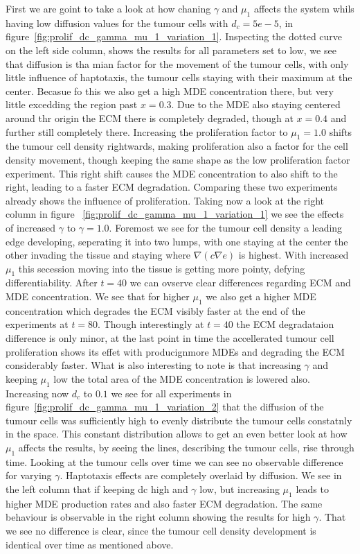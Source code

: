 First we are goint to take a look at how chaning $\gamma$ and $\mu_1$ affects the system whils having low diffusion values for the tumour cells with $d_c=5e-5$, in figure~\ref{fig:prolif_dc_gamma_mu_1_variation_1}. Inspecting the dotted curve on the left side column, shows the results for all parameters set to low, we see that diffusion is tha mian factor for the movement of the tumour cells, with only little influence of haptotaxis, the tumour cells staying with their maximum at the center. Becasue fo this we also get a high MDE concentration there, but very little excedding the region past $x=0.3$. Due to the MDE also staying centered around thr origin the ECM there is completely degraded, though at $x=0.4$ and further still completely there. Increasing the proliferation factor to $\mu_1=1.0$ shifts the tumour cell density rightwards, making proliferation also a factor for the cell density movement, though keeping the same shape as the low proliferation factor experiment. This right shift causes the MDE concentration to also shift to the right, leading to a faster ECM degradation. Comparing these two experiments already shows the influence of proliferation.\newline
Taking now a look at the right column in figure ~\ref{fig:prolif_dc_gamma_mu_1_variation_1} we see the effects of increased $\gamma$ to $\gamma=1.0$. Foremost we see for the tumour cell density a leading edge developing, seperating it into two lumps, with one staying at the center the other invading the tissue and staying where $\nabla (c \nabla e)$ is highest. With increased $\mu_1$ this secession moving into the tissue is getting more pointy, defying differentiability. After $t=40$ we can ovserve clear differences regarding ECM and MDE concentration. We see that for higher $\mu_1$ we also get a higher MDE concentration which degrades the ECM visibly faster at the end of the experiments at $t=80$. Though interestingly at $t=40$ the ECM degradataion difference is only minor, at the last point in time the accellerated tumour cell proliferation shows its effet with producignmore MDEs and degrading the ECM considerably faster. What is also interesting to note is that increasing $\gamma$ and keeping $\mu_1$ low the total area of the MDE concentration is lowered also.
Increasing now $d_c$ to $0.1$ we see for all experiments in figure~\ref{fig:prolif_dc_gamma_mu_1_variation_2} that the diffusion of the tumour cells was sufficiently high to evenly distribute the tumour cells constatnly in the space. This constant distribution allows to get an even better look at how $\mu_1$ affects the results, by seeing the lines, describing the tumour cells, rise through time. Looking at the tumour cells over time we can see no observable difference for varying $\gamma$. Haptotaxis effects are completely overlaid by diffusion. We see in the left column that if keeping dc high and $\gamma$ low, but increasing $\mu_1$ leads to higher MDE production rates and also faster ECM degradation. The same behaviour is observable in the right column showing the results for high $\gamma$. That we see no difference is clear, since the tumour cell density development is identical over time as mentioned above. 

